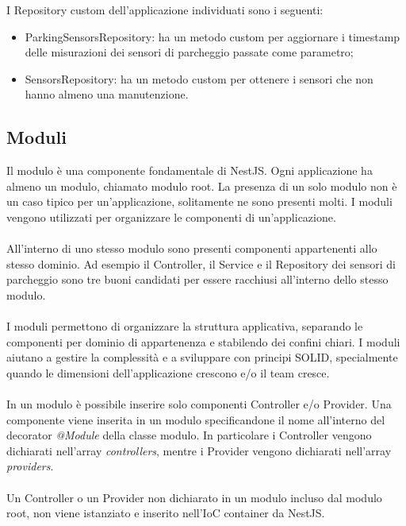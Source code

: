 \leavevmode\newline
I Repository custom dell'applicazione individuati sono i seguenti:
\begin{itemize}
    \item ParkingSensorsRepository: ha un metodo custom per aggiornare i timestamp delle misurazioni dei sensori di parcheggio 
        passate come parametro;
    \item SensorsRepository: ha un metodo custom per ottenere i sensori che non hanno almeno una manutenzione.
\end{itemize}

\subsection{Moduli}
Il modulo è una componente fondamentale di NestJS. Ogni applicazione ha almeno un modulo, chiamato modulo root. 
La presenza di un solo modulo non è un caso tipico per un'applicazione, solitamente ne sono presenti molti.
I moduli vengono utilizzati per organizzare le componenti di un'applicazione.
\\\\
All'interno di uno stesso modulo sono presenti componenti appartenenti allo stesso dominio. Ad esempio
il Controller, il Service e il Repository dei sensori di parcheggio sono tre buoni candidati per essere racchiusi 
all'interno dello stesso modulo.
\\\\
I moduli permettono di organizzare la struttura applicativa, separando le componenti per dominio di appartenenza
e stabilendo dei confini chiari. I moduli aiutano a gestire la complessità e a 
sviluppare con principi SOLID, specialmente quando le dimensioni dell'applicazione crescono e/o il team cresce.
\\\\
In un modulo è possibile inserire solo componenti Controller e/o Provider. Una componente viene inserita in un modulo
specificandone il nome all'interno del decorator
\textit{@Module} della classe modulo. In particolare i Controller vengono dichiarati 
nell'array \textit{controllers},
mentre i Provider vengono dichiarati nell'array \textit{providers}. 
\\\\
Un Controller o un Provider non dichiarato in un modulo incluso dal modulo
root, non viene istanziato e inserito nell'IoC container da NestJS.
\\\\
